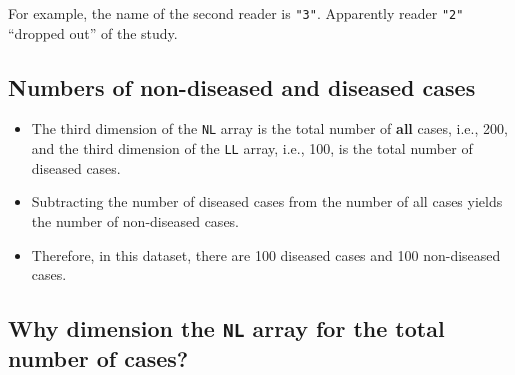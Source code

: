 \documentclass[]{book}
\newenvironment{Shaded}{\begin{snugshade}}{\end{snugshade}}
\newcommand{\CommentTok}[1]{\textcolor[rgb]{0.56,0.35,0.01}{\textit{#1}}}
\newcommand{\DecValTok}[1]{\textcolor[rgb]{0.00,0.00,0.81}{#1}}
\newcommand{\KeywordTok}[1]{\textcolor[rgb]{0.13,0.29,0.53}{\textbf{#1}}}
\newcommand{\NormalTok}[1]{#1}
\newcommand{\OperatorTok}[1]{\textcolor[rgb]{0.81,0.36,0.00}{\textbf{#1}}}
\begin{document}
\begin{Shaded}
\end{Shaded}

For example, the name of the second reader is \texttt{"3"}. Apparently reader \texttt{"2"} ``dropped out'' of the study.

\hypertarget{numbers-of-non-diseased-and-diseased-cases}{%
\subsection{Numbers of non-diseased and diseased cases}\label{numbers-of-non-diseased-and-diseased-cases}}

\begin{Shaded}
\end{Shaded}

\begin{itemize}
\item
  The third dimension of the \texttt{NL} array is the total number of \textbf{all} cases, i.e., 200, and the third dimension of the \texttt{LL} array, i.e., 100, is the total number of diseased cases.
\item
  Subtracting the number of diseased cases from the number of all cases yields the number of non-diseased cases.
\item
  Therefore, in this dataset, there are 100 diseased cases and 100 non-diseased cases.
\end{itemize}

\hypertarget{why-dimension-the-nl-array-for-the-total-number-of-cases}{%
\subsection{\texorpdfstring{Why dimension the \texttt{NL} array for the total number of cases?}{Why dimension the NL array for the total number of cases?}}\label{why-dimension-the-nl-array-for-the-total-number-of-cases}}
\end{document}
